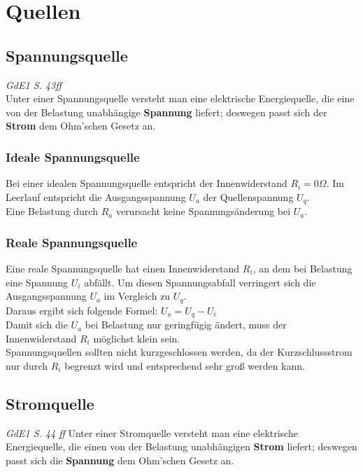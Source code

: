 \chapter{Quellen}

\section{Spannungsquelle}
\textit{GdE1 S. 43ff} \\
Unter einer Spannungsquelle versteht man eine elektrische Energiequelle, die eine von der Belastung unabhängige \textbf{Spannung} liefert; deswegen passt sich der \textbf{Strom} dem Ohm'schen Gesetz an.

\subsection{Ideale Spannungsquelle}
Bei einer idealen Spannungsquelle entspricht der Innenwiderstand $R_i = 0\Omega$. Im Leerlauf entspricht die Ausgangsspannung $U_a$ der Quellenspannung $U_q$.\\

Eine Belastung durch $R_a$ verursacht keine Spannungsänderung bei $U_a$.

\subsection{Reale Spannungsquelle}
Eine reale Spannungsquelle hat einen Innenwiderstand $R_i$, an dem bei Belastung eine Spannung $U_i$ abfällt. Um diesen Spannungsabfall verringert sich die Ausgangsspannung $U_a$ im Vergleich zu $U_q$.\\

Daraus ergibt sich folgende Formel: $U_a = U_q - U_i$ \\

Damit sich die $U_a$ bei Belastung nur geringfügig ändert, muss der Innenwiderstand $R_i$ möglichst klein sein.\\

Spannungsquellen sollten nicht kurzgeschlossen werden, da der Kurzschlussstrom nur durch $R_i$ begrenzt wird und entsprechend sehr groß werden kann.

\section{Stromquelle}
\textit{GdE1 S. 44 ff}
Unter einer Stromquelle versteht man eine elektrische Energiequelle, die einen von der Belastung unabhängigen \textbf{Strom} liefert; deswegen passt sich die \textbf{Spannung} dem Ohm'schen Gesetz an.

